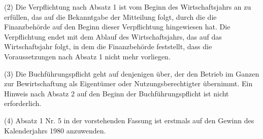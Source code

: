 \documentclass{article}
\begin{document}
(2) Die Verpflichtung nach Absatz 1 ist vom Beginn des Wirtschaftsjahrs an zu erfüllen, das auf die Bekanntgabe der Mitteilung folgt, durch die die Finanzbehörde auf den Beginn dieser Verpflichtung hingewiesen hat. Die Verpflichtung endet mit dem Ablauf des Wirtschaftsjahrs, das auf das Wirtschaftsjahr folgt, in dem die Finanzbehörde feststellt, dass die Voraussetzungen nach Absatz 1 nicht mehr vorliegen.

(3) Die Buchführungspflicht geht auf denjenigen über, der den Betrieb im Ganzen zur Bewirtschaftung als Eigentümer oder Nutzungsberechtigter übernimmt. Ein Hinweis nach Absatz 2 auf den Beginn der Buchführungspflicht ist nicht erforderlich.

(4) Absatz 1 Nr. 5 in der vorstehenden Fassung ist erstmals auf den Gewinn des Kalenderjahrs 1980 anzuwenden.
\end{document}
